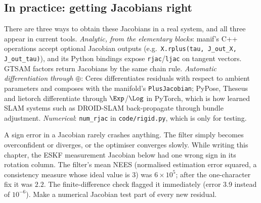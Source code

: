 \subsection{In practice: getting Jacobians right}\label{sec:lie:jacobians-in-practice}

There are three ways to obtain these Jacobians in a real system, and all three appear in current tools. \emph{Analytic, from the elementary blocks}: manif's C++ operations accept optional Jacobian outputs (e.g.\ \texttt{X.rplus(tau, J\_out\_X, J\_out\_tau)}), and its Python bindings expose \texttt{rjac}/\texttt{ljac} on tangent vectors. GTSAM factors return Jacobians by the same chain rule. \emph{Automatic differentiation through $\oplus$}: Ceres differentiates residuals with respect to ambient parameters and composes with the manifold's \texttt{PlusJacobian}; PyPose, Theseus and lietorch differentiate through $\Exp$/$\Log$ in PyTorch, which is how learned SLAM systems such as DROID-SLAM back-propagate through bundle adjustment. \emph{Numerical}: \texttt{num\_rjac} in \texttt{code/rigid.py}, which is only for testing.

\begin{pitfall}
A sign error in a Jacobian rarely crashes anything. The filter simply becomes overconfident or diverges, or the optimiser converges slowly. While writing this chapter, the ESKF measurement Jacobian below had one wrong sign in its rotation column. The filter's mean NEES (normalised estimation error squared, a consistency measure whose ideal value is 3) was $6\times10^5$; after the one-character fix it was $2.2$. The finite-difference check flagged it immediately (error 3.9 instead of $10^{-6}$). Make a numerical Jacobian test part of every new residual.
\end{pitfall}

